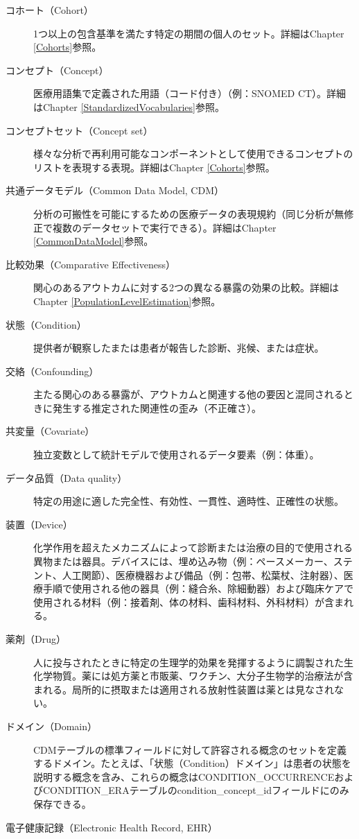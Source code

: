 \documentclass[
  11pt]{book}
\theoremstyle{definition}
\theoremstyle{definition}
\theoremstyle{definition}
\theoremstyle{definition}
\theoremstyle{remark}
\begin{document}
\begin{description}
\item[コホート（Cohort）]
1つ以上の包含基準を満たす特定の期間の個人のセット。詳細はChapter \ref{Cohorts}参照。
\item[コンセプト（Concept）]
医療用語集で定義された用語（コード付き）（例：SNOMED CT）。詳細はChapter \ref{StandardizedVocabularies}参照。
\item[コンセプトセット（Concept set）]
様々な分析で再利用可能なコンポーネントとして使用できるコンセプトのリストを表現する表現。詳細はChapter \ref{Cohorts}参照。
\item[共通データモデル（Common Data Model, CDM）]
分析の可搬性を可能にするための医療データの表現規約（同じ分析が無修正で複数のデータセットで実行できる）。詳細はChapter \ref{CommonDataModel}参照。
\item[比較効果（Comparative Effectiveness）]
関心のあるアウトカムに対する2つの異なる暴露の効果の比較。詳細はChapter \ref{PopulationLevelEstimation}参照。
\item[状態（Condition）]
提供者が観察したまたは患者が報告した診断、兆候、または症状。
\item[交絡（Confounding）]
主たる関心のある暴露が、アウトカムと関連する他の要因と混同されるときに発生する推定された関連性の歪み（不正確さ）。
\item[共変量（Covariate）]
独立変数として統計モデルで使用されるデータ要素（例：体重）。
\item[データ品質（Data quality）]
特定の用途に適した完全性、有効性、一貫性、適時性、正確性の状態。
\item[装置（Device）]
化学作用を超えたメカニズムによって診断または治療の目的で使用される異物または器具。デバイスには、埋め込み物（例：ペースメーカー、ステント、人工関節）、医療機器および備品（例：包帯、松葉杖、注射器）、医療手順で使用される他の器具（例：縫合糸、除細動器）および臨床ケアで使用される材料（例：接着剤、体の材料、歯科材料、外科材料）が含まれる。
\item[薬剤（Drug）]
人に投与されたときに特定の生理学的効果を発揮するように調製された生化学物質。薬には処方薬と市販薬、ワクチン、大分子生物学的治療法が含まれる。局所的に摂取または適用される放射性装置は薬とは見なされない。
\item[ドメイン（Domain）]
CDMテーブルの標準フィールドに対して許容される概念のセットを定義するドメイン。たとえば、「状態（Condition）ドメイン」は患者の状態を説明する概念を含み、これらの概念はCONDITION\_OCCURRENCEおよびCONDITION\_ERAテーブルのcondition\_concept\_idフィールドにのみ保存できる。
\item[電子健康記録（Electronic Health Record, EHR）]

\end{description}
\end{document}
